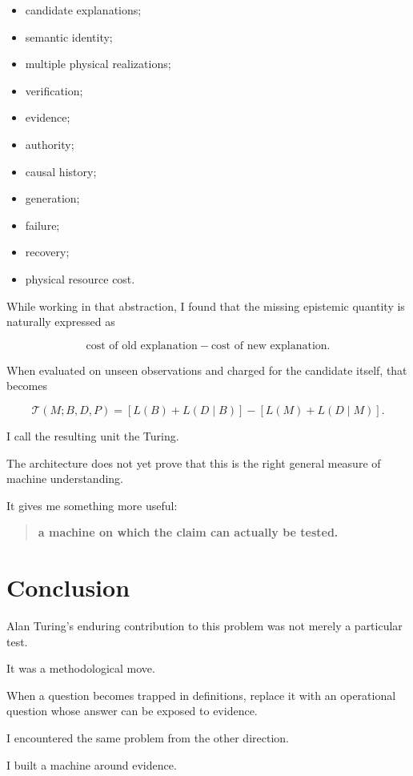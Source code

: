 \documentclass[11pt]{article}
\begin{document}
\begin{itemize}
    \item candidate explanations;
    \item semantic identity;
    \item multiple physical realizations;
    \item verification;
    \item evidence;
    \item authority;
    \item causal history;
    \item generation;
    \item failure;
    \item recovery;
    \item physical resource cost.
\end{itemize}

While working in that abstraction, I found that the missing epistemic quantity is naturally expressed as

\[
\text{cost of old explanation}
-
\text{cost of new explanation}.
\]

When evaluated on unseen observations and charged for the candidate itself, that becomes

\[
\boxed{
\mathcal{T}(M;B,D,P)
=
[L(B)+L(D\mid B)]
-
[L(M)+L(D\mid M)].
}
\]

I call the resulting unit the Turing.

The architecture does not yet prove that this is the right general measure of machine understanding.

It gives me something more useful:

\begin{quote}
\textbf{a machine on which the claim can actually be tested.}
\end{quote}

\section{Conclusion}

Alan Turing's enduring contribution to this problem was not merely a particular test.

It was a methodological move.

When a question becomes trapped in definitions, replace it with an operational question whose answer can be exposed to evidence.

I encountered the same problem from the other direction.

I built a machine around evidence.
\end{document}
